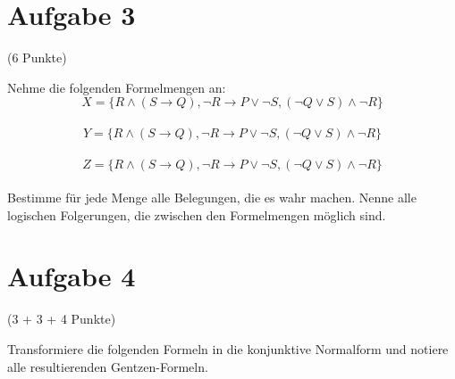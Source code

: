 \documentclass{exam}
\newcommand{\Punkte}[1]{\begin{flushright}(#1 Punkte)\end{flushright}}
\begin{document}
	\clearpage
	\section{Aufgabe 3}
		
	\Punkte{6}
	
	Nehme die folgenden Formelmengen an:\\
	$$ X = \{ R \land (S \rightarrow Q), \lnot R \rightarrow P \lor \lnot S, (\lnot Q \lor S) \land \lnot R \} $$\\
	$$ Y = \{ R \land (S \rightarrow Q), \lnot R \rightarrow P \lor \lnot S, (\lnot Q \lor S) \land \lnot R \} $$\\
	$$ Z = \{ R \land (S \rightarrow Q), \lnot R \rightarrow P \lor \lnot S, (\lnot Q \lor S) \land \lnot R \} $$\\
	Bestimme für jede Menge alle Belegungen, die es wahr machen. Nenne alle logischen Folgerungen, die zwischen den Formelmengen möglich sind.
	
	\clearpage
	\section{Aufgabe 4}
	
	\Punkte{3 + 3 + 4}
	
	Transformiere die folgenden Formeln in die konjunktive Normalform und notiere alle resultierenden Gentzen-Formeln.\\
	
	
	
	
\end{document}
